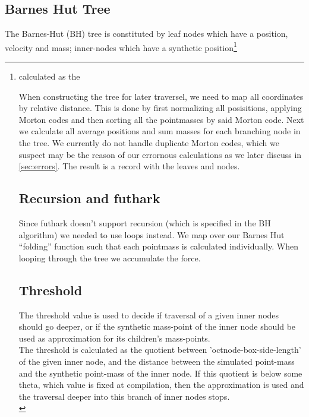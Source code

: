 \subsection{Barnes Hut Tree}
The Barnes-Hut (BH) tree is constituted by leaf nodes which have a position, velocity and mass; inner-nodes which have a synthetic position\footnote{calculated as the  


When constructing the tree for later traversel, we need to map all coordinates
by relative distance. This is done by first normalizing all posisitions,
applying Morton codes and then sorting all the pointmasses by said Morton code.
Next we calculate all average positions and sum masses for each branching node
in the tree. We currently do not handle duplicate Morton codes, which we suspect
may be the reason of our errornous calculations as we later discuss in
\autoref{sec:errors}. The result is a record with the leaves and nodes.

\subsection{Recursion and futhark}
Since futhark doesn't support recursion (which is specified in the BH algorithm)
we needed to use loops instead. We map over our Barnes Hut ``folding'' function
such that each pointmass is calculated individually. When looping through the
tree we accumulate the force.

\begin{Figure}
  \centering
\lstset{firstnumber=41}

\end{Figure}

\subsection{Threshold}
The threshold value is used to decide if traversal of a given inner nodes should go
deeper, or if the synthetic mass-point of the inner node should be used as
approximation for its children's mass-points. \\


The threshold is calculated as the quotient between 'octnode-box-side-length' of
the given inner node, and the distance between the simulated point-mass and the
synthetic point-mass of the inner node. If this quotient is below some theta,
which value is fixed at compilation, then the approximation is used and the
traversal deeper into this branch of inner nodes stops. \\

}
